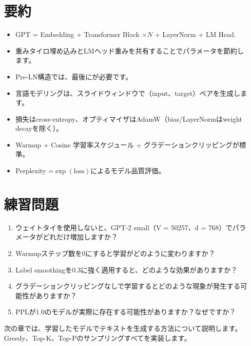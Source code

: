 \section{要約}

\begin{itemize}
  \item GPT = Embedding + Transformer Block $\times N$ + LayerNorm + LM Head.
\item 重みタイロ埋め込みとLMヘッド重みを共有することでパラメータを節約します。
\item Pre-LN構造では、最後にが必要です。
\item 言語モデリングは、スライドウィンドウで（input、target）ペアを生成します。
\item 損失はcross-entropy、オプティマイザはAdamW（bias/LayerNormはweight decayを除く）。
\item Warmup + Cosine 学習率スケジュール + グラデーションクリッピングが標準。
\item Perplexity =$\exp(\text{loss})$によるモデル品質評価。
\end{itemize}

\section{練習問題}

\begin{enumerate}
\item ウェイトタイを使用しないと、GPT-2 small（V = 50257、d = 768）でパラメータがどれだけ増加しますか？
\item Warmupステップ数を0にすると学習がどのように変わりますか？
\item Label smoothingを0.3に強く適用すると、どのような効果がありますか？
\item グラデーションクリッピングなしで学習するとどのような現象が発生する可能性がありますか？
\item PPLが1.0のモデルが実際に存在する可能性がありますか？なぜですか？
\end{enumerate}

次の章では、学習したモデルでテキストを生成する方法について説明します。 Greedy、Top-K、Top-Pのサンプリングすべてを実装します。
